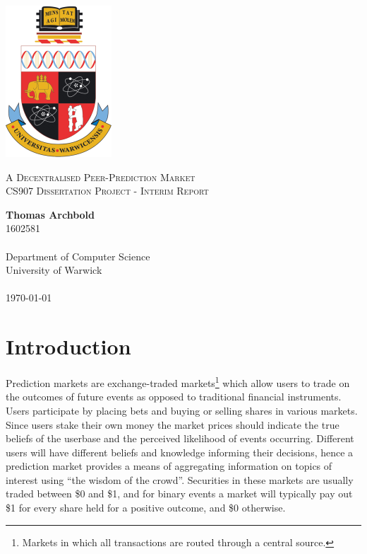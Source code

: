 \documentclass[10pt,a4paper]{article}
\theoremstyle{plain}
\theoremstyle{definition}
\begin{document}
\begin{titlepage}
    \begin{center}

        \vspace*{2cm}
        \includegraphics[width=.25\textwidth]{crest.png}

        \vspace*{1cm}
		{\Large \textsc{A Decentralised Peer-Prediction Market}} \\
		{\textsc{CS907 Dissertation Project - Interim Report}}

        \vspace*{1cm}
        \textbf{Thomas Archbold} \\
		1602581 \\~\\
        Department of Computer Science \\
        University of Warwick \\~\\

		\today

        \vfill

    \end{center}
\end{titlepage}

\section{Introduction}

Prediction markets are exchange-traded markets\footnote{Markets in which all
transactions are routed through a central source.} which allow users to trade
on the outcomes of future events as opposed to traditional financial
instruments. Users participate by placing bets and buying or selling shares in
various markets. Since users stake their own money the market prices should
indicate the true beliefs of the userbase and the perceived likelihood of
events occurring. Different users will have different beliefs and knowledge
informing their decisions, hence a prediction market provides a means of
aggregating information on topics of interest using ``the wisdom of the
crowd''. Securities in these markets are usually traded between \$0 and \$1,
and for binary events a market will typically pay out \$1 for every share held
for a positive outcome, and \$0 otherwise.
\end{document}
